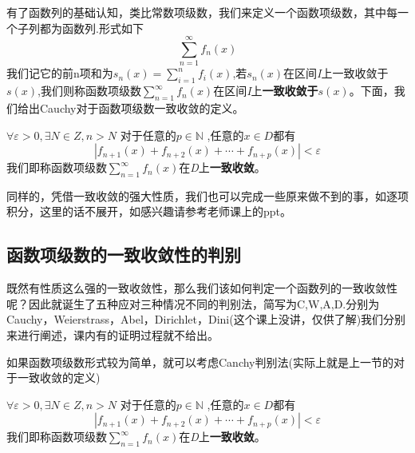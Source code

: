 \documentclass[lang=cn,10pt]{elegantbook}
\begin{document}
有了函数列的基础认知，类比常数项级数，我们来定义一个函数项级数，其中每一个子列都为函数列.形式如下
\begin{equation*}
	\sum_{n=1}^{\infty } f_{n}(x)
\end{equation*}
我们记它的前n项和为$s_{n}(x)=\sum_{i=1}^{n} f_{i}(x)$,若$s_{n}(x)$在区间\textit{I}上一致收敛于$s(x)$,我们则称函数项级数$\sum_{n=1}^{\infty } f_{n}(x)$在区间\textit{I}上\textbf{一致收敛于$s(x)$}。下面，我们给出Cauchy对于函数项级数一致收敛的定义。
\begin{definition}

$\forall \varepsilon > 0,\exists N \in Z, n>N$ 
对于任意的$p \in  \mathbb{N}$ ,任意的$x \in D $都有
\begin{equation*}
	|f_{n+1}(x)+f_{n+2}(x)+\cdots+f_{n+p}(x)|<\varepsilon
\end{equation*}		
我们即称函数项级数$\sum_{n=1}^{\infty } f_{n}(x)$在\textit{D}上\textbf{一致收敛}。
\end{definition}
同样的，凭借一致收敛的强大性质，我们也可以完成一些原来做不到的事，如逐项积分，这里的话不展开，如感兴趣请参考老师课上的ppt。


\subsection{函数项级数的一致收敛性的判别}

既然有性质这么强的一致收敛性，那么我们该如何判定一个函数列的一致收敛性呢？因此就诞生了五种应对三种情况不同的判别法，简写为C,W,A,D.分别为Cauchy，Weierstrass，Abel，Dirichlet，Dini(这个课上没讲，仅供了解)我们分别来进行阐述，课内有的证明过程就不给出。


如果函数项级数形式较为简单，就可以考虑Canchy判别法(实际上就是上一节的对于一致收敛的定义)
\begin{theorem}[Canchy判别法]
	
	$\forall \varepsilon > 0,\exists N \in Z, n>N$ 
	对于任意的$p \in  \mathbb{N}$ ,任意的$x \in D $都有
	\begin{equation*}
		|f_{n+1}(x)+f_{n+2}(x)+\cdots+f_{n+p}(x)|<\varepsilon
	\end{equation*}		
	我们即称函数项级数$\sum_{n=1}^{\infty } f_{n}(x)$在\textit{D}上\textbf{一致收敛}。
\end{theorem}
\end{document}
